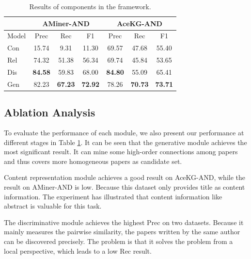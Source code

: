 \documentclass[letterpaper]{article} %
\begin{document}
\begin{table}[t]
\caption{Results of components in the framework.}
\label{tb:contribution}
\begin{center}
\small
\begin{tabular}{l|ccc|ccc}
\toprule[0.1em]
& \multicolumn{3}{c|}{AMiner-AND} & \multicolumn{3}{c}{AceKG-AND}\\
\hline
Model & Prec & Rec & F1& Prec & Rec & F1 \\
\hline
Con & 15.74 & 9.31 & 11.30 & 69.57 & 47.68 & 55.40 \\
Rel & 74.32	& 51.38	& 56.34 & 69.74 & 45.84 & 53.65\\
Dis & \textbf{84.58} & 59.83 & 68.00 & \textbf{84.80} & 55.09 & 65.41\\
Gen & 82.23 & \textbf{67.23} & \textbf{72.92} & 78.26 & \textbf{70.73} & \textbf{73.71}\\
\bottomrule[0.1em]
\end{tabular}
\end{center}
\end{table}

\subsection{Ablation Analysis}
To evaluate the performance of each module, we also present our performance at different stages in Table \ref{tb:contribution}.
It can be seen that the generative module achieves the most significant result.
It can mine some high-order connections among papers and thus covers more homogeneous papers as candidate set.

Content representation module achieves a good result on AceKG-AND,
while the result on AMiner-AND is low. Because this dataset only provides title as content information.
The experiment has illustrated that content information like abstract is valuable for this task.

The discriminative module achieves the highest Prec on two datasets. Because it mainly measures the pairwise similarity, the papers written by the same author
 can be discovered precisely.
The problem is that it solves the problem from a local perspective, which leads to a low Rec result.
\end{document}
